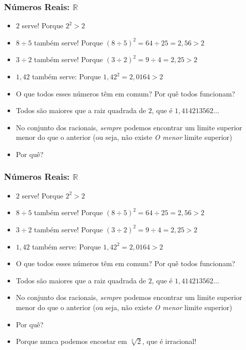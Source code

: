 \documentclass[usenames,dvipsnames,svgnames]{beamer}
\begin{document}
\begin{frame}
	
	\frametitle{Números Reais: $\mathbb{R}$}

	\begin{itemize}
		\item $2$ serve! Porque $2^2 > 2$
		\item $8 \div 5$ também serve! Porque $(8 \div 5)^2 = 64 \div 25 = 2,56 > 2$
		\item $3 \div 2$ também serve! Porque $(3 \div 2)^2 = 9 \div 4 = 2,25 > 2$
		\item $1,42$ também serve: Porque $1,42^2 = 2,0164 > 2$
		\item O que todos esses números têm em comum? Por quê todos funcionam?
		\item Todos são maiores que a raiz quadrada de $2$, que é $1,414213562\dots$
		\item No conjunto dos racionais, \emph{sempre} podemos encontrar um limite superior menor do que o anterior (ou seja, não existe \emph{O menor} limite superior)
		\item Por quê?
	\end{itemize}

\end{frame}

\begin{frame}
	
	\frametitle{Números Reais: $\mathbb{R}$}

	\begin{itemize}
		\item $2$ serve! Porque $2^2 > 2$
		\item $8 \div 5$ também serve! Porque $(8 \div 5)^2 = 64 \div 25 = 2,56 > 2$
		\item $3 \div 2$ também serve! Porque $(3 \div 2)^2 = 9 \div 4 = 2,25 > 2$
		\item $1,42$ também serve: Porque $1,42^2 = 2,0164 > 2$
		\item O que todos esses números têm em comum? Por quê todos funcionam?
		\item Todos são maiores que a raiz quadrada de $2$, que é $1,414213562\dots$
		\item No conjunto dos racionais, \emph{sempre} podemos encontrar um limite superior menor do que o anterior (ou seja, não existe \emph{O menor} limite superior)
		\item Por quê?
		\item Porque nunca podemos encostar em $\sqrt[2]{2}$, que é irracional!
	\end{itemize}

\end{frame}
\end{document}

